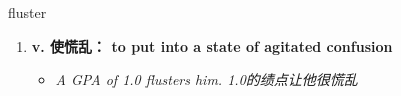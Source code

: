 
\begin{frame}
{\huge fluster}
\begin{center}
\begin{enumerate}\Large
  \item \textbf{v. 使慌乱： to put into a state of agitated confusion}
  \begin{itemize}
    \item \em{\Large{A GPA of 1.0 flusters him. 1.0的绩点让他很慌乱}}
  \end{itemize}
\end{enumerate}
\end{center}
\end{frame}
